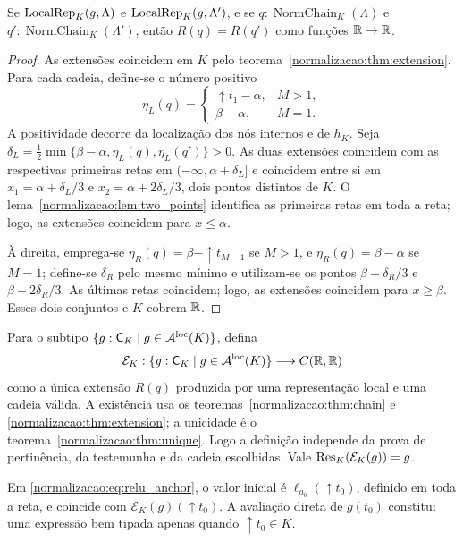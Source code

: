 \begin{teorema}\label{map:normalizacao:8.6}\label{normalizacao:thm:unique}
Se $\operatorname{LocalRep}_K(g,\Lambda)$ e $\operatorname{LocalRep}_K(g,\Lambda')$, e se
$q:\operatorname{NormChain}_K(\Lambda)$ e
$q':\operatorname{NormChain}_K(\Lambda')$, então
$R(q)=R(q')$ como funções $\mathbb R\to\mathbb R$.
\end{teorema}
\begin{proof}
As extensões coincidem em $K$ pelo teorema~\ref{normalizacao:thm:extension}.
Para cada cadeia, define-se o número positivo
\[
 \eta_L(q)=\begin{cases}
 \uparrow t_1-\alpha,&M>1,\\
 \beta-\alpha,&M=1.
 \end{cases}
\]
A positividade decorre da localização dos nós internos e de $h_K$.
Seja
$\delta_L=\tfrac12\min\{\beta-\alpha,\eta_L(q),\eta_L(q')\}>0$.
As duas extensões coincidem com as respectivas primeiras retas em
$(-\infty,\alpha+\delta_L]$ e coincidem entre si em
$x_1=\alpha+\delta_L/3$ e
$x_2=\alpha+2\delta_L/3$, dois pontos distintos de $K$.
O lema~\ref{normalizacao:lem:two_points} identifica as primeiras retas
em toda a reta; logo, as extensões coincidem para $x\le\alpha$.

À direita, emprega-se
$\eta_R(q)=\beta-\uparrow t_{M-1}$ se $M>1$, e
$\eta_R(q)=\beta-\alpha$ se $M=1$; define-se $\delta_R$
pelo mesmo mínimo e utilizam-se os pontos
$\beta-\delta_R/3$ e $\beta-2\delta_R/3$.
As últimas retas coincidem; logo, as extensões coincidem para
$x\ge\beta$. Esses dois conjuntos e $K$ cobrem $\mathbb R$.
\end{proof}

\begin{definicao}\label{map:normalizacao:8.7}
Para o subtipo $\{g:\mathsf C_K\mid g\in\mathcal A^{\mathrm{loc}}(K)\}$, defina
\[
 \mathcal E_K:\{g:\mathsf C_K\mid g\in\mathcal A^{\mathrm{loc}}(K)\}\longrightarrow C(\mathbb R,\mathbb R)
\]
como a única extensão $R(q)$ produzida por uma representação local
e uma cadeia válida. A existência usa os
teoremas~\ref{normalizacao:thm:chain} e \ref{normalizacao:thm:extension}; a unicidade é o
teorema~\ref{normalizacao:thm:unique}. Logo a definição independe da prova de
pertinência, da testemunha e da cadeia escolhidas. Vale
$\operatorname{Res}_K(\mathcal E_K(g))=g$.
\end{definicao}

Em \eqref{normalizacao:eq:relu_anchor}, o valor inicial é
$\ell_{a_0}(\uparrow t_0)$, definido em toda a reta, e coincide com
$\mathcal E_K(g)(\uparrow t_0)$. A avaliação direta de $g(t_0)$
constitui uma expressão bem tipada apenas quando $\uparrow t_0\in K$.

